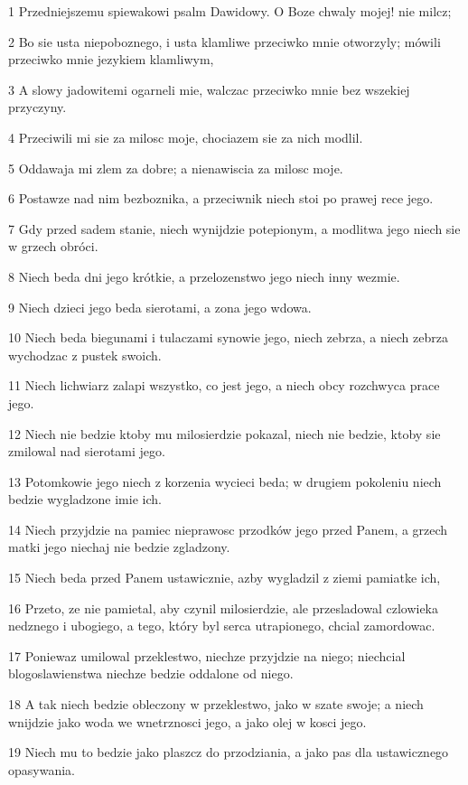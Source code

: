\par 1 Przedniejszemu spiewakowi psalm Dawidowy. O Boze chwaly mojej! nie milcz;
\par 2 Bo sie usta niepoboznego, i usta klamliwe przeciwko mnie otworzyly; mówili przeciwko mnie jezykiem klamliwym,
\par 3 A slowy jadowitemi ogarneli mie, walczac przeciwko mnie bez wszekiej przyczyny.
\par 4 Przeciwili mi sie za milosc moje, chociazem sie za nich modlil.
\par 5 Oddawaja mi zlem za dobre; a nienawiscia za milosc moje.
\par 6 Postawze nad nim bezboznika, a przeciwnik niech stoi po prawej rece jego.
\par 7 Gdy przed sadem stanie, niech wynijdzie potepionym, a modlitwa jego niech sie w grzech obróci.
\par 8 Niech beda dni jego krótkie, a przelozenstwo jego niech inny wezmie.
\par 9 Niech dzieci jego beda sierotami, a zona jego wdowa.
\par 10 Niech beda biegunami i tulaczami synowie jego, niech zebrza, a niech zebrza wychodzac z pustek swoich.
\par 11 Niech lichwiarz zalapi wszystko, co jest jego, a niech obcy rozchwyca prace jego.
\par 12 Niech nie bedzie ktoby mu milosierdzie pokazal, niech nie bedzie, ktoby sie zmilowal nad sierotami jego.
\par 13 Potomkowie jego niech z korzenia wycieci beda; w drugiem pokoleniu niech bedzie wygladzone imie ich.
\par 14 Niech przyjdzie na pamiec nieprawosc przodków jego przed Panem, a grzech matki jego niechaj nie bedzie zgladzony.
\par 15 Niech beda przed Panem ustawicznie, azby wygladzil z ziemi pamiatke ich,
\par 16 Przeto, ze nie pamietal, aby czynil milosierdzie, ale przesladowal czlowieka nedznego i ubogiego, a tego, który byl serca utrapionego, chcial zamordowac.
\par 17 Poniewaz umilowal przeklestwo, niechze przyjdzie na niego; niechcial blogoslawienstwa niechze bedzie oddalone od niego.
\par 18 A tak niech bedzie obleczony w przeklestwo, jako w szate swoje; a niech wnijdzie jako woda we wnetrznosci jego, a jako olej w kosci jego.
\par 19 Niech mu to bedzie jako plaszcz do przodziania, a jako pas dla ustawicznego opasywania.
